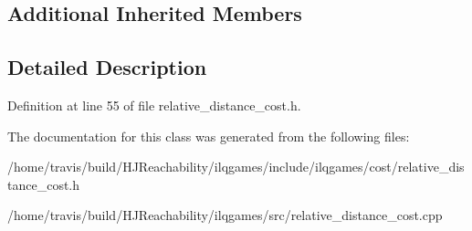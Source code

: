 \subsection*{Additional Inherited Members}


\subsection{Detailed Description}


Definition at line 55 of file relative\+\_\+distance\+\_\+cost.\+h.



The documentation for this class was generated from the following files\+:\begin{DoxyCompactItemize}
\item 
/home/travis/build/\+H\+J\+Reachability/ilqgames/include/ilqgames/cost/relative\+\_\+distance\+\_\+cost.\+h\item 
/home/travis/build/\+H\+J\+Reachability/ilqgames/src/relative\+\_\+distance\+\_\+cost.\+cpp\end{DoxyCompactItemize}
